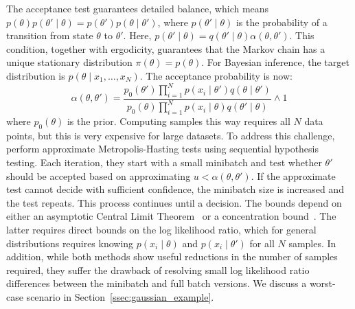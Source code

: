 \documentclass[twoside]{article} \usepackage{aistats2017}
\begin{document}
The acceptance test guarantees detailed balance, which means
$p(\theta)p(\theta'\mid\theta) = p(\theta')p(\theta \mid\theta')$, where
$p(\theta'\mid\theta)$ is the probability of a transition from state $\theta$ to
$\theta'$. Here, $p(\theta'\mid\theta)=q(\theta'\mid\theta)\alpha(\theta,\theta')$.
This condition, together with ergodicity, guarantees that the Markov chain has a
unique stationary distribution $\pi(\theta) = p(\theta)$. For Bayesian
inference, the target distribution is $p(\theta \mid x_1, \ldots, x_N)$. The
acceptance probability is now:
\begin{equation}\label{eq:acceptance_probability}
    \alpha(\theta,\theta') = 
    \frac{p_0(\theta')\prod_{i=1}^N p(x_i \mid \theta')q(\theta \mid
    \theta')}{p_0(\theta)\prod_{i=1}^N p(x_i \mid \theta)q(\theta' \mid\theta)}
    \wedge 1
\end{equation}
where $p_0(\theta)$ is the prior. Computing samples this way requires all $N$
data points, but this is very expensive for large datasets. To address this
challenge,~\citet{cutting_mh_2014,icml2014c1_bardenet14} perform approximate
Metropolis-Hasting tests using sequential hypothesis testing. Each iteration,
they start with a small minibatch and test whether $\theta'$ should be accepted
based on approximating $u<\alpha(\theta,\theta')$. If the approximate test
cannot decide with sufficient confidence, the minibatch size is increased and
the test repeats. This process continues until a decision. The bounds depend on
either an asymptotic Central Limit Theorem~\citep{cutting_mh_2014} or a
concentration bound~\citep{icml2014c1_bardenet14}. The latter requires direct
bounds on the log likelihood ratio, which for general distributions requires
knowing $p(x_i \mid \theta)$ and $p(x_i \mid \theta')$ for all $N$ samples. In
addition, while both methods show useful reductions in the number of samples
required, they suffer the drawback of resolving small log likelihood ratio
differences between the minibatch and full batch versions. We discuss a
worst-case scenario in Section~\ref{ssec:gaussian_example}.
\end{document}
